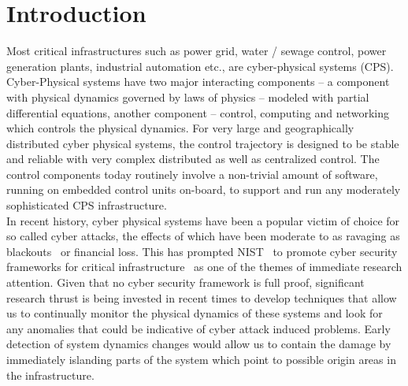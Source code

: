 \section{Introduction} \label{sec:intro}
\noindent
Most critical infrastructures such as power grid, water / sewage control, power generation plants, industrial automation etc., are cyber-physical systems (CPS). Cyber-Physical systems have two major interacting components -- a component with physical dynamics governed by laws of physics -- modeled with partial differential equations, another component -- control, computing and networking which controls the physical dynamics. For very large and geographically distributed cyber physical systems, the control trajectory is designed to be stable and reliable with very complex distributed as well as centralized control. The control components today 
routinely involve a non-trivial amount of software, running on embedded control units on-board, to support and run any moderately sophisticated CPS infrastructure. \\

\noindent
In recent history, cyber physical systems have been a popular victim of choice for so called cyber attacks, the effects of which have been moderate to as ravaging as blackouts~\cite{blackout} or financial loss. This has prompted 
NIST~\cite{nist} to promote cyber security frameworks for critical infrastructure~\cite{cs-Framewrok} as 
one of the themes of immediate research attention. Given that no cyber security framework is full proof, significant research thrust is being invested in recent times to develop techniques that allow us to continually monitor the physical dynamics of these systems and look for any anomalies that could be indicative of cyber attack induced problems. Early detection of system dynamics changes would allow us to contain the damage by immediately islanding parts of the system which point to possible origin areas in the infrastructure. \\

